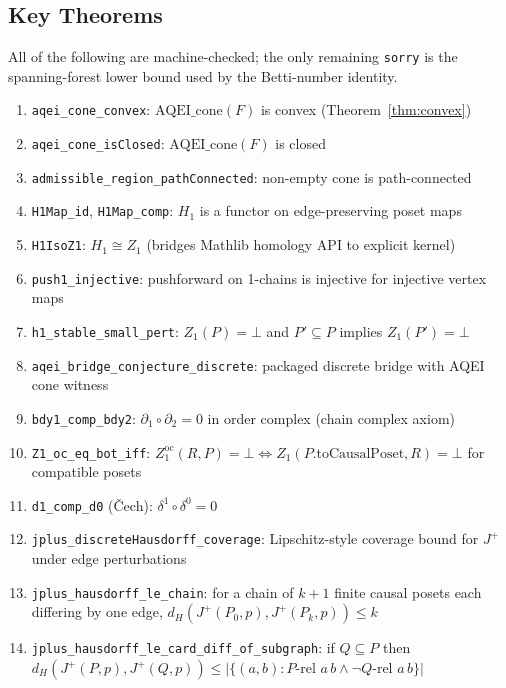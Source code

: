 \documentclass[12pt]{article}
\begin{document}
\subsection{Key Theorems}

All of the following are machine-checked; the only remaining \texttt{sorry}
is the spanning-forest lower bound used by the Betti-number identity.

\begin{enumerate}
    \item \texttt{aqei\_cone\_convex}: $\mathrm{AQEI\_cone}(F)$ is convex
          (Theorem~\ref{thm:convex})
    \item \texttt{aqei\_cone\_isClosed}: $\mathrm{AQEI\_cone}(F)$ is closed
    \item \texttt{admissible\_region\_pathConnected}: non-empty cone is path-connected
    \item \texttt{H1Map\_id}, \texttt{H1Map\_comp}: $H_1$ is a functor on
          edge-preserving poset maps
    \item \texttt{H1IsoZ1}: $H_1 \cong Z_1$ (bridges Mathlib homology API
          to explicit kernel)
    \item \texttt{push1\_injective}: pushforward on 1-chains is injective
          for injective vertex maps
    \item \texttt{h1\_stable\_small\_pert}: $Z_1(P)=\bot$ and
          $P'\subseteq P$ implies $Z_1(P')=\bot$
    \item \texttt{aqei\_bridge\_conjecture\_discrete}: packaged discrete
          bridge with AQEI cone witness
    \item \texttt{bdy1\_comp\_bdy2}: $\partial_1\circ\partial_2=0$ in order
          complex (chain complex axiom)
    \item \texttt{Z1\_oc\_eq\_bot\_iff}: $Z_1^{\mathrm{oc}}(R,P)=\bot
          \iff Z_1(P.\mathrm{toCausalPoset}, R)=\bot$ for compatible posets
    \item \texttt{d1\_comp\_d0} (\v{C}ech): $\delta^1\circ\delta^0=0$
    \item \texttt{jplus\_discreteHausdorff\_coverage}: Lipschitz-style
          coverage bound for $J^+$ under edge perturbations
    \item \texttt{jplus\_hausdorff\_le\_chain}: for a chain of $k+1$ finite
          causal posets each differing by one edge, $d_H(J^+(P_0,p),J^+(P_k,p))\leq k$
    \item \texttt{jplus\_hausdorff\_le\_card\_diff\_of\_subgraph}: if
          $Q\subseteq P$ then
          $d_H(J^+(P,p),J^+(Q,p))\leq |\{(a,b):P\text{-rel }a\,b\land\lnot Q\text{-rel }a\,b\}|$

\end{enumerate}
\end{document}
